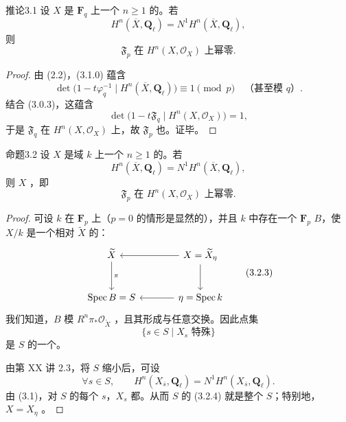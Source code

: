 \begin{SGAresult}{推论}{3.1}
设 $X$ 是 $\mathbf F_q$ 上一个 $n\geq1$ 的。若
\[
 H^n(\overline X,\mathbf Q_\ell)=N^1H^n(\overline X,\mathbf Q_\ell),
 \tag{3.1.0}
\]
则
\[
 \mathfrak F_p\text{ 在 }H^n(X,\mathcal O_X)\text{ 上幂零}.
 \tag{3.1.1}
\]
\end{SGAresult}
\begin{proof}
由 (2.2)，(3.1.0) 蕴含
\[
 \det\bigl(1-t\varphi_q^{-1}\mid H^n(\overline X,\mathbf Q_\ell)\bigr)
 \equiv1\pmod p\quad\text{（甚至模 }q\text{）}.
 \tag{3.1.2}
\]
结合 (3.0.3)，这蕴含
\[
 \det\bigl(1-t\mathfrak F_q\mid H^n(X,\mathcal O_X)\bigr)=1,
 \tag{3.1.3}
\]
于是 $\mathfrak F_q$ 在 $H^n(X,\mathcal O_X)$ 上，故 $\mathfrak F_p$ 也。证毕。
\end{proof}

\begin{SGAresult}{命题}{3.2}
设 $X$ 是域 $k$ 上一个 $n\geq1$ 的。若
\[
 H^n(\overline X,\mathbf Q_\ell)=N^1H^n(\overline X,\mathbf Q_\ell),
 \tag{3.2.1}
\]
则 $X$ ，即
\[
 \mathfrak F_p\text{ 在 }H^n(X,\mathcal O_X)\text{ 上幂零}.
 \tag{3.2.2}
\]
\end{SGAresult}
\begin{proof}
可设 $k$ 在 $\mathbf F_p$ 上（$p=0$ 的情形是显然的），并且 $k$ 中存在一个 $\mathbf F_p$  $B$，使 $X/k$ 是一个相对 $\widetilde X$ 的：
\[
\begin{tikzcd}[column sep=large,row sep=large]
 \widetilde X\arrow[d,"\pi"]&X=\widetilde X_\eta\arrow[l]\arrow[d]\\
 \operatorname{Spec}B=S&\eta=\operatorname{Spec}k\arrow[l]
\end{tikzcd}
\tag{3.2.3}
\]
我们知道，$B$ 模 $R^n\pi_*\mathcal O_{\widetilde X}$ ，且其形成与任意交换。因此点集
\[
 \{s\in S\mid X_s\text{ 特殊}\}
 \tag{3.2.4}
\]
是 $S$ 的一个。

由第 XX 讲 2.3，将 $S$ 缩小后，可设
\[
 \forall s\in S,\qquad
 H^n(X_{\overline s},\mathbf Q_\ell)=N^1H^n(X_{\overline s},\mathbf Q_\ell).
 \tag{3.2.5}
\]
由 (3.1)，对 $S$ 的每个 $s$，$X_s$ 都。从而 $S$ 的 (3.2.4) 就是整个 $S$；特别地，$X=X_\eta$ 。
\end{proof}

